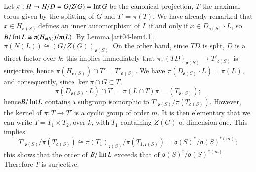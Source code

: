 Let $\pi:H\to H/D=G/Z(G)=\operatorname{\mathrm{Int}} G$ be the canonical projection, $T$ the maximal torus given by the splitting of $G$ and $T'=\pi(T)$. We have already remarked that $x\in H_{\mathfrak{o}(S)}$ defines an inner automorphism of $L$ if and only if $x\in D_{\mathfrak{o}(S)}\cdot L$, so $B/\operatorname{\mathrm{Int}} L\cong \pi(H_{\mathfrak{o}(S)})/\pi(L)$. By Lemma \ref{art04-lem4.1}, $\pi(N(L))\cong (G/Z(G))_{\mathfrak{o}(S)}$. On the other hand, since $TD$ is split, $D$ is a direct factor over $k$; this implies immediately that $\pi:(TD)_{\mathfrak{o}(S)}\to T'_{\mathfrak{o}(S)}$ is surjective, hence $\pi(H_{\mathfrak{o}(S)})\cap T'=T'_{\mathfrak{o}(S)}$. We have $\pi(D_{\mathfrak{o}(S)}\cdot L)=\pi(L)$, and consequently, since $\ker \pi \cap G\subset T$,
$$
\pi (D_{\mathfrak{o}(S)}\cdot L)\cap T'=\pi(L\cap T)\pi=(T_{\mathfrak{o}(S)});
$$
hence\pageoriginale $B/\operatorname{\mathrm{Int}} L$ contains a subgroup isomorphic to $T'_{\mathfrak{o}(S)}/\pi(T_{\mathfrak{o}(S)})$. However, the kernel of $\pi:T\to T'$ is a cyclic group of order $m$. It is then elementary that we can write $T=T_{1}\times T_{2}$, over $k$, with $T_{1}$ containing $Z(G)$ of dimension one. This implies
$$
T'_{\mathfrak{o}(S)}/\pi(T_{\mathfrak{o}(S)})\cong \pi(T_{1})_{\mathfrak{o}(S)}/\pi(T_{1,\mathfrak{o}(S)})=\mathfrak{o}(S)^{*}/\mathfrak{o}(S)^{*(m)};
$$
this shows that the order of $B/\operatorname{\mathrm{Int}} L$ exceeds that of $\mathfrak{o}(S)^{*}/\mathfrak{o}(S)^{*(m)}$. Therefore $T$ is surjective.

